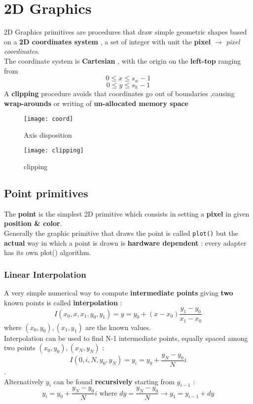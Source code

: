 \section{2D Graphics}
2D Graphics primitives are procedures that draw simple geometric shapes based on a \textbf{2D coordinates system} , a set of integer with unit the \textbf{pixel} $ \to $ \textit{pixel coordinates}.\\
The coordinate system is \textbf{Cartesian} , with the origin on the \textbf{left-top} ranging from $$ 0 \leq x \leq s_w-1 $$ $$ 0 \leq y \leq s_h-1 $$
A \textbf{clipping} procedure avoids that coordinates go out of boundaries ,causing \textbf{wrap-arounds} or writing of \textbf{un-allocated memory space} 
\begin{figure}[!h]
\begin{minipage}{.5\textwidth}
 \centering
  \texttt{[image: coord]}
  \caption{Axis disposition}
\end{minipage}%
	\begin{minipage}{.5\textwidth}
  \centering
  \texttt{[image: clipping]}
  \caption{clipping}
\end{minipage}%
\end{figure}

\subsection{Point primitives}
The \textbf{point} is the simplest 2D primitive which consists in setting a \textbf{pixel} in given \textbf{position \& color}.\\
Generally the graphic primitive that draws the point is called \texttt{plot()} but the \textbf{actual} way in which a point is drawn is \textbf{hardware dependent} : every adapter has its own plot() algorithm.\\
\newpage
\subsubsection{Linear Interpolation}
A very simple numerical way to compute \textbf{intermediate points} giving \textbf{two} known points is called \textbf{interpolation} : $$I(x_0,x,x_1,y_0,y_1) = y = y_0+(x-x_0)\frac{y_1-y_0}{x_1-x_0} $$ where $ (x_0,y_0) , (x_1,y_1) $ are the known values.\\
Interpolation can be used to find N-1 intermediate points, equally spaced among two points $ (x_0,y_0), (x_N,y_N) $ :  $$I(0,i,N,y_0,y_N) = y_i = y_0+\frac{y_N-y_0}{N}i $$. \\Alternatively $y_i$ can be found \textbf{recursively} starting from $y_{i-1}$ : 
$$ y_i = y_0+\frac{y_N-y_0}{N}i \text{ where } dy= \frac{y_N-y_0}{N} \to y_1 = y_{i-1} + dy $$
\newpage
